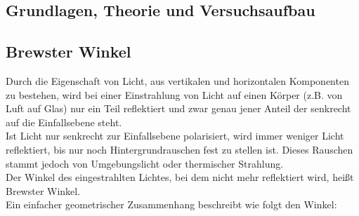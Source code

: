 \documentclass[12pt,a4paper]{article}
\begin{document}
\begin{multicols}{2}




%			



\section{Grundlagen, Theorie und Versuchsaufbau}

\subsection{Brewster Winkel}
Durch die Eigenschaft von Licht, aus vertikalen und horizontalen Komponenten zu bestehen, wird bei einer Einstrahlung von Licht auf einen Körper (z.B. von Luft auf Glas) nur ein Teil reflektiert und zwar genau jener Anteil der senkrecht auf die Einfallsebene steht.\\
Ist Licht nur senkrecht zur Einfallsebene polarisiert, wird immer weniger Licht reflektiert, bis nur noch Hintergrundrauschen fest zu stellen ist. Dieses Rauschen stammt jedoch von Umgebungslicht oder thermischer Strahlung.\\ 
Der Winkel des eingestrahlten Lichtes, bei dem nicht mehr reflektiert wird, heißt Brewster Winkel.\\
Ein einfacher geometrischer Zusammenhang beschreibt wie folgt den Winkel:


\end{multicols}
\end{document}
